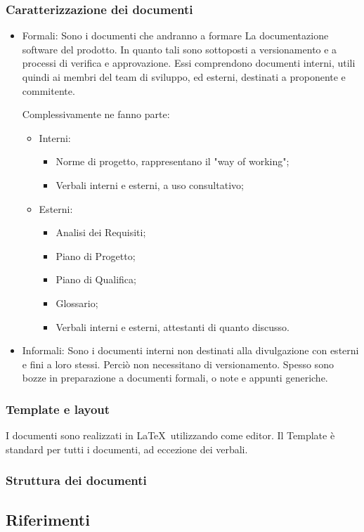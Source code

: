 \subsubsection{Caratterizzazione dei documenti}
\begin{itemize}
    \item Formali:
    Sono i documenti che andranno a formare La documentazione software del prodotto. In quanto tali sono sottoposti a versionamento e a processi di verifica e approvazione.
    Essi comprendono documenti interni, utili quindi ai membri del team di sviluppo, ed esterni, destinati a proponente e commitente.

    Complessivamente ne fanno parte:
    \begin{itemize}
        \item Interni: 
        \begin{itemize}
            \item Norme di progetto, rappresentano il "way of working";
            \item Verbali interni e esterni, a uso consultativo;
        \end{itemize}
        \item Esterni:
         \begin{itemize}
            \item Analisi dei Requisiti;
            \item Piano di Progetto; 
            \item Piano di Qualifica; 
            \item Glossario; 
            \item Verbali interni e esterni, attestanti di quanto discusso.
        \end{itemize}
    \end{itemize}
    \item Informali:
    Sono i documenti interni non destinati alla divulgazione con esterni e fini a loro stessi. Perciò non necessitano di versionamento.
    Spesso sono bozze in preparazione a documenti formali, o note e appunti generiche.
\end{itemize}
\subsubsection{Template e layout}
I documenti sono realizzati in \LaTeX\ utilizzando come editor. Il Template è standard per tutti i documenti, ad eccezione dei verbali.

\subsubsection{Struttura dei documenti}




\subsection{Riferimenti}
